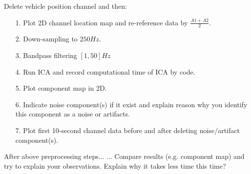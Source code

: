 \documentclass[a4 paper]{article}
\begin{document}
\begin{tcolorbox}[colback=RubineRed!5!white,colframe=RubineRed!75!black]
Delete vehicle position channel and then:  
\begin{itemize}
    \item[1.] Plot 2D channel location map and re-reference data by $\frac{A1+A2}{2}$.
    \item[2.] Down-sampling to $250Hz$.
    \item[3.] Bandpass filtering $[1,50]Hz$ 
    \item[4.] Run ICA and record computational time of ICA by code.
    \item[5.]Plot component map in 2D.
    \item[6.] Indicate noise component(s) if it exist and explain reason why you identify this component as a noise or artifacts.
    \item[7.] Plot first 10-second channel data before and after deleting noise/artifact component(s).
\end{itemize}   
After above preprocessing steps... ...
 Compare results (e.g. component map) and try to explain your observations.
 Explain why it takes less time this time?
\end{tcolorbox}
\end{document}
